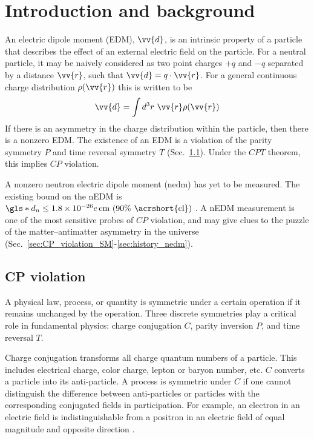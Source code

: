 
\chapter{Introduction and background}


An electric dipole moment (EDM), $\vv{d}$, is an intrinsic property of a particle that describes the effect of an external electric field on the particle. For a neutral particle, it may be naively considered as two point charges $+q$ and $-q$ separated by a distance $\vv{r}$, such that $\vv{d}=q\cdot \vv{r}$. For a general continuous charge distribution $\rho(\vv{r})$ this is written to be
%
\begin{gather}
    \vv{d}=\int d^3r\,\,\vv{r}\rho(\vv{r})
\end{gather}
%
If there is an asymmetry in the charge distribution within the particle, then there is a nonzero EDM. The existence of an EDM is a violation of the parity symmetry $P$ and time reversal symmetry $T$ (Sec.~\ref{sec:CP_violation}). Under the $CPT$ theorem, this implies $CP$ violation.

A nonzero neutron electric dipole moment (\acrshort*{nedm}) has yet to be measured. The existing bound on the nEDM is $\gls*{d_n}\leq 1.8\times10^{-26}e\,\text{cm (90\% \acrshort{cl})}$ \cite{pdg2022}. A nEDM measurement is one of the most sensitive probes of $CP$ violation, and may give clues to the puzzle of the matter–antimatter asymmetry in the universe (Sec.~\ref{sec:CP_violation_SM}-\ref{sec:history_nedm}).


\section{CP violation}\label{sec:CP_violation}


A physical law, process, or quantity is symmetric under a certain operation if it remains unchanged by the operation. Three discrete symmetries play a critical role in fundamental physics: charge conjugation $C$, parity inversion $P$, and time reversal $T$.

Charge conjugation transforms all charge quantum numbers of a particle. This includes electrical charge, color charge, lepton or baryon number, etc. $C$ converts a particle into its anti-particle. A process is symmetric under $C$ if one cannot distinguish the difference between anti-particles or particles with the corresponding conjugated fields in participation. For example, an electron in an electric field is indistinguishable from a positron in an electric field of equal magnitude and opposite direction \cite{schmidt-wellenburg_quest_2017}.

